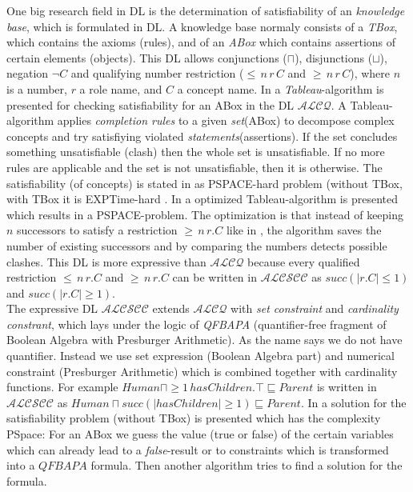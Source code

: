 \documentclass[a4paper,11pt]{scrartcl}
\theoremstyle{break}
\theoremstyle{definition}
\begin{document}
One big research field in DL is the determination of satisfiability of an \textit{knowledge base}, which is formulated in DL. A knowledge base normaly consists of a \textit{TBox}, which contains the axioms (rules), and of an \textit{ABox} which contains assertions of certain elements (objects). This DL allows conjunctions ($\sqcap$), disjunctions ($\sqcup$), negation $\neg C$ and qualifying number restriction ($\leq\,n\,r\, C$ and $\geq \, n\, r\, C$), where $n$ is a number, $r$ a role name, and $C$ a concept name. In \cite{1} a \textit{Tableau}-algorithm is presented for checking satisfiability for an ABox in the DL $\mathcal{ALCQ}$. A Tableau-algorithm applies \textit{completion rules} to a given \textit{set}(ABox) to decompose complex concepts and try satisfiying violated \textit{statements}(assertions). If the set concludes something unsatisfiable (clash) then the whole set is unsatisfiable. If no more rules are applicable and the set is not unsatisfiable, then it is otherwise. The satisfiability (of concepts) is stated in \cite{1} as PSPACE-hard problem (without TBox, with TBox it is EXPTime-hard \cite{4}. In \cite{pspace} a optimized Tableau-algorithm is presented which results in a PSPACE-problem. The optimization is that instead of keeping $n$ successors to satisfy a restriction $\geq\,n\,r.C$ like in \cite{1}, the algorithm saves the number of existing successors and by comparing the numbers detects possible clashes. This DL is more expressive than $\mathcal{ALCQ}$ because every qualified restriction $\leq\,n\,r.C$ and $\geq \, n\, r.C$ can be written in $\mathcal{ALCSCC}$ as $succ(|r.C|\leq 1)$ and $succ(|r.C|\geq 1)$. \\
The expressive DL $\mathcal{ALCSCC}$ extends $\mathcal{ALCQ}$ with \textit{set constraint} and \textit{cardinality constrant}, which lays under the logic of \textit{QFBAPA} (quantifier-free fragment of Boolean Algebra with Presburger Arithmetic). As the name says we do not have quantifier. Instead we use set expression (Boolean Algebra part) and numerical constraint (Presburger Arithmetic) which is combined together with cardinality functions. For example $Human\sqcap \geq 1\,hasChildren.\top\sqsubseteq Parent$ is written in $\mathcal{ALCSCC}$ as $Human\sqcap succ(|hasChildren|\geq 1)\sqsubseteq Parent$. In \cite{4} a solution for the satisfiability problem (without TBox) is presented which has the complexity PSpace: For an ABox we guess the value (true or false) of the certain variables which can already lead to a \textit{false}-result or to constraints which is transformed into a $QFBAPA$ formula. Then another algorithm tries to find a solution for the formula.\\
\end{document}
